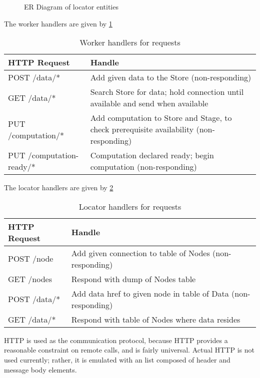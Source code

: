 \begin{figure}

\caption{ER Diagram of locator entities}
\label{fig:locatordb}
\end{figure}

The worker handlers are given by \cref{tbl:whandler}

\begin{table}[]
\caption{Worker handlers for requests}
\label{tbl:whandler}
\begin{tabular}{@{}ll@{}}
\toprule
HTTP Request             & Handle                                                                         \\ \midrule
POST /data/*             & Add given data to the Store (non-responding)                                   \\
GET /data/*              & Search Store for data; hold connection until available and send when available \\
PUT /computation/* & Add computation to Store and Stage, to check prerequisite availability (non-responding) \\
PUT /computation-ready/* & Computation declared ready; begin computation (non-responding)                 \\ \bottomrule
\end{tabular}
\end{table}

The locator handlers are given by \cref{tbl:lhandler}

\begin{table}[]
\caption{Locator handlers for requests}
\label{tbl:lhandler}
\begin{tabular}{@{}ll@{}}
\toprule
HTTP Request & Handle                                                        \\ \midrule
POST /node   & Add given connection to table of Nodes (non-responding)       \\
GET /nodes   & Respond with dump of Nodes table                              \\
POST /data/* & Add data href to given node in table of Data (non-responding) \\
GET /data/*  & Respond with table of Nodes where data resides                \\ \bottomrule
\end{tabular}
\end{table}

HTTP is used as the communication protocol, because HTTP provides a reasonable constraint on remote calls, and is fairly universal.
Actual HTTP is not used currently; rather, it is emulated with an \R list composed of header and message body elements.

